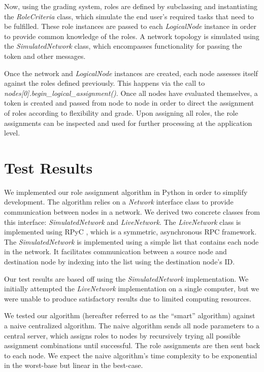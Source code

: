 \documentclass[11pt]{article}
\begin{document}
\begin{multicols}{2}
Now, using the grading system, roles are defined by subclassing and instantiating the \textit{RoleCriteria} class, which simulate the end user's required tasks that need to be fulfilled. These role instances are passed to each \textit{LogicalNode} instance in order to provide common knowledge of the roles. A network topology is simulated using the \textit{SimulatedNetwork} class, which encompasses functionality for passing the token and other messages.

Once the network and \textit{LogicalNode} instances are created, each node assesses itself against the roles defined previously. This happens via the call to \textit{nodes[0].begin\_logical\_assignment()}. Once all nodes have evaluated themselves, a token is created and passed from node to node in order to direct the assignment of roles according to flexibility and grade. Upon assigning all roles, the role assignments can be inspected and used for further processing at the application level.
\vfill
\section{Test Results}

We implemented our role assignment algorithm in Python in order to simplify development. The algorithm relies on a \textit{Network} interface class to provide communication between nodes in a network. We derived two concrete classes from this interface: \textit{SimulatedNetwork} and \textit{LiveNetwork}. The \textit{LiveNetwork} class is implemented using RPyC \cite{rpyc}, which is a symmetric, asynchronous RPC framework. The \textit{SimulatedNetwork} is implemented using a simple list that contains each node in the network. It facilitates communication between a source node and destination node by indexing into the list using the destination node's ID.

Our test results are based off using the \textit{SimulatedNetwork} implementation. We initially attempted the \textit{LiveNetwork} implementation on a single computer, but we were unable to produce satisfactory results due to limited computing resources.

We tested our algorithm (hereafter referred to as the ``smart'' algorithm) against a naive centralized algorithm. The naive algorithm sends all node parameters to a central server, which assigns roles to nodes by recursively trying all possible assignment combinations until successful. The role assignments are then sent back to each node. We expect the naive algorithm's time complexity to be exponential in the worst-base but linear in the best-case.


\end{multicols}
\end{document}

